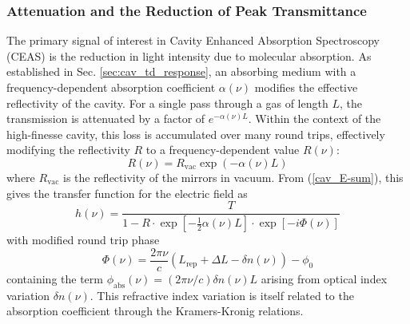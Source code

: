 \documentclass[12pt]{report}
\begin{document}
	\subsubsection{Attenuation and the Reduction of Peak Transmittance}
	
	The primary signal of interest in Cavity Enhanced Absorption Spectroscopy (CEAS) is the reduction in light intensity due to molecular absorption. As established in Sec. \ref{sec:cav_td_response}, an absorbing medium with a frequency-dependent absorption coefficient $\alpha(\nu)$ modifies the effective reflectivity of the cavity. For a single pass through a gas of length $L$, the transmission is attenuated by a factor of $e^{-\alpha(\nu) L}$. Within the context of the high-finesse cavity, this loss is accumulated over many round trips, effectively modifying the reflectivity $R$ to a frequency-dependent value $R(\nu)$:
	\begin{equation} \label{eq:eff_reflectivity}
		R(\nu) = R_{\text{vac}} \exp\left( -\alpha(\nu) L \right)
	\end{equation}
	where $R_{\text{vac}}$ is the reflectivity of the mirrors in vacuum. From (\ref{cav_E-sum}), this gives the transfer function for the electric field \cite{vernier_continuous_filtering} as
	\begin{equation}
		h(\nu) = \frac{T}{1 - R \cdot \exp\left[-\frac{1}{2}\alpha(\nu)L\right]\cdot \exp\left[- i \Phi(\nu)\right]}
	\end{equation}
	with modified round trip phase
	\begin{equation}
		\Phi(\nu) = \frac{2\pi \nu}{c} \left( L_\mathrm{rep} + \Delta L - \delta n(\nu) \right) - \phi_0
	\end{equation}
	containing the term $\phi_\mathrm{abs}(\nu) = (2\pi\nu/c)\delta n(\nu) L$ arising from optical index variation $\delta n(\nu)$. This refractive index variation is itself related to the absorption coefficient through the Kramers-Kronig relations.
	
\end{document}
